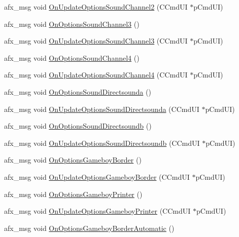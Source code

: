 \begin{DoxyCompactItemize}
\item 
afx\+\_\+msg void \mbox{\hyperlink{class_main_wnd_a23b93b9a81b78b2c0107df90b7df6510}{On\+Update\+Options\+Sound\+Channel2}} (C\+Cmd\+UI $\ast$p\+Cmd\+UI)
\item 
afx\+\_\+msg void \mbox{\hyperlink{class_main_wnd_afa834c32c467c4c0e60aeea35034336b}{On\+Options\+Sound\+Channel3}} ()
\item 
afx\+\_\+msg void \mbox{\hyperlink{class_main_wnd_a9dbf1190b86d5962ea43afb16fb48559}{On\+Update\+Options\+Sound\+Channel3}} (C\+Cmd\+UI $\ast$p\+Cmd\+UI)
\item 
afx\+\_\+msg void \mbox{\hyperlink{class_main_wnd_a1c6886c26731e96cff8cd50c16c42101}{On\+Options\+Sound\+Channel4}} ()
\item 
afx\+\_\+msg void \mbox{\hyperlink{class_main_wnd_aafd7a1e3f482022ffbb6731f02de0ee1}{On\+Update\+Options\+Sound\+Channel4}} (C\+Cmd\+UI $\ast$p\+Cmd\+UI)
\item 
afx\+\_\+msg void \mbox{\hyperlink{class_main_wnd_adf862907e5764ee38c51cdd192dc5bae}{On\+Options\+Sound\+Directsounda}} ()
\item 
afx\+\_\+msg void \mbox{\hyperlink{class_main_wnd_a47d8a1f6079e54d268ff2a19a34aba6e}{On\+Update\+Options\+Sound\+Directsounda}} (C\+Cmd\+UI $\ast$p\+Cmd\+UI)
\item 
afx\+\_\+msg void \mbox{\hyperlink{class_main_wnd_a19e333bd762c2497d3ff416d21c3c0c0}{On\+Options\+Sound\+Directsoundb}} ()
\item 
afx\+\_\+msg void \mbox{\hyperlink{class_main_wnd_aa1b7a906630cf65b6a41c416eaecf3c3}{On\+Update\+Options\+Sound\+Directsoundb}} (C\+Cmd\+UI $\ast$p\+Cmd\+UI)
\item 
afx\+\_\+msg void \mbox{\hyperlink{class_main_wnd_a8fce3257c75cb141371c422adbcb5fd1}{On\+Options\+Gameboy\+Border}} ()
\item 
afx\+\_\+msg void \mbox{\hyperlink{class_main_wnd_a29620d7ff13dcf0a51ba63a051e9b2d4}{On\+Update\+Options\+Gameboy\+Border}} (C\+Cmd\+UI $\ast$p\+Cmd\+UI)
\item 
afx\+\_\+msg void \mbox{\hyperlink{class_main_wnd_a5909d22b4cea6315004fc60b0f997b23}{On\+Options\+Gameboy\+Printer}} ()
\item 
afx\+\_\+msg void \mbox{\hyperlink{class_main_wnd_ab7257fc8414b9a73639c04106ecd1765}{On\+Update\+Options\+Gameboy\+Printer}} (C\+Cmd\+UI $\ast$p\+Cmd\+UI)
\item 
afx\+\_\+msg void \mbox{\hyperlink{class_main_wnd_a3a618010f19c5aa69a036380631eaea7}{On\+Options\+Gameboy\+Border\+Automatic}} ()
\item 

\end{DoxyCompactItemize}
